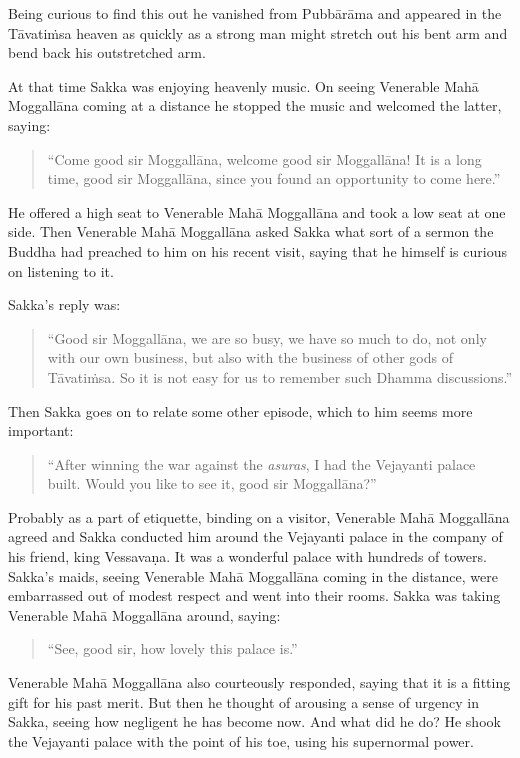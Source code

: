 Being curious to find this out he vanished from Pubbārāma and appeared in the Tāvatiṁsa heaven as quickly as a strong man might stretch out his bent arm and bend back his outstretched arm.

At that time Sakka was enjoying heavenly music. On seeing Venerable Mahā Moggallāna coming at a distance he stopped the music and welcomed the latter, saying:

\begin{quote}
``Come good sir Moggallāna, welcome good sir Moggallāna! It is a long time, good sir Moggallāna, since you found an opportunity to come here.''
\end{quote}

\clearpage

He offered a high seat to Venerable Mahā Moggallāna and took a low seat at one side. Then Venerable Mahā Moggallāna asked Sakka what sort of a sermon the Buddha had preached to him on his recent visit, saying that he himself is curious on listening to it.

Sakka's reply was:

\begin{quote}
``Good sir Moggallāna, we are so busy, we have so much to do, not only with our own business, but also with the business of other gods of Tāvatiṁsa. So it is not easy for us to remember such Dhamma discussions.''
\end{quote}

Then Sakka goes on to relate some other episode, which to him seems more important:

\begin{quote}
``After winning the war against the \emph{asuras}, I had the Vejayanti palace built. Would you like to see it, good sir Moggallāna?''
\end{quote}

Probably as a part of etiquette, binding on a visitor, Venerable Mahā Moggallāna agreed and Sakka conducted him around the Vejayanti palace in the company of his friend, king Vessavaṇa. It was a wonderful palace with hundreds of towers. Sakka's maids, seeing Venerable Mahā Moggallāna coming in the distance, were embarrassed out of modest respect and went into their rooms. Sakka was taking Venerable Mahā Moggallāna around, saying:

\begin{quote}
``See, good sir, how lovely this palace is.''
\end{quote}

Venerable Mahā Moggallāna also courteously responded, saying that it is a fitting gift for his past merit. But then he thought of arousing a sense of urgency in Sakka, seeing how negligent he has become now. And what did he do? He shook the Vejayanti palace with the point of his toe, using his supernormal power.

